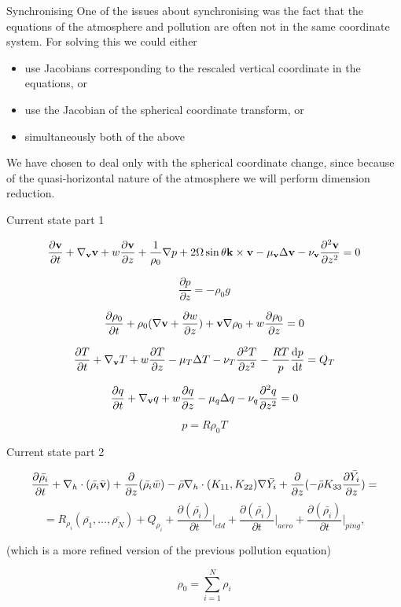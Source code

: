 \documentclass{beamer}
\begin{document}
\begin{frame}{Synchronising}
One of the issues about synchronising was the fact that the equations of the atmosphere and pollution are often not in the same coordinate system.
For solving this we could either
\begin{itemize}
\item use Jacobians corresponding to the rescaled vertical coordinate in the equations, or
\item use the Jacobian of the spherical coordinate transform, or
\item simultaneously both of the above
\end{itemize}
We have chosen to deal only with the spherical coordinate change, since because of the quasi-horizontal nature of the atmosphere we will perform dimension reduction. 
\end{frame}

\begin{frame}{Current state part 1}

\[ \frac{\partial \bold{v} }{\partial t} + \nabla_{\bold{v}}\bold{v} + w  \frac{\partial \bold{v} }{\partial z} + \frac{1}{\rho_0}\nabla p + 2 \Omega \sin \theta \bold{k} \times \bold{v}  -\mu_{\bold{v}}\Delta \bold{v}  -\nu_{\bold{v}} \frac{\partial ^ 2 \bold{v} }{\partial z^2} = 0  \]

\[ \frac{\partial p }{\partial z} = - \rho_0 g \]

\[ \frac{\partial \rho_0}{\partial t} + \rho_0 (\nabla \bold{v} + \frac{\partial w }{\partial z}) + \bold{v} \nabla \rho_0 + w \frac{\partial \rho_0}{\partial z} = 0 \]

\[ \frac{\partial T }{\partial t} + \nabla_{\bold{v}} T  + w  \frac{\partial T }{\partial z} - \mu_T \Delta T  -\nu_T \frac{\partial^2 T }{\partial z^2} -\frac{RT}{p} \frac{\mathrm{d}p}{\mathrm{d}t} = Q_T \]

\[ \frac{\partial q }{\partial t} + \nabla_{\bold{v}}q + w \frac{\partial q}{\partial z} - \mu_q \Delta q  - \nu_q \frac{\partial ^2 q }{\partial z^2} = 0 \]

\[ p = R \rho_0 T \]

\end{frame}

\begin{frame}{Current state part 2}

 \[ \frac{\partial \bar{\rho_i}}{\partial t}  + \nabla_{h} \cdot (\bar{\rho_i} \bar{\bold{v}}) + \frac{\partial}{\partial z} (\bar{\rho_i} \bar{w})  -\bar{\rho} \nabla_{h} \cdot (K_{11}, K_{22}) \nabla \bar{Y_i} + \frac{\partial}{\partial z} (-\bar{\rho} K_{33} \frac{\partial \bar{Y_i}}{\partial z}) = \]
 \[ = R_{\rho_i} (\bar{\rho_1}, \dots , \bar{\rho_N}) + Q_{\rho_i} + \frac{\partial (\bar{\rho_i})}{\partial t} \rvert_{cld} + \frac{\partial (\bar{\rho_i})}{\partial t} \rvert_{aero} + \frac{\partial (\bar{\rho_i})}{\partial t} \rvert_{ping},\]
 
 (which is a more refined version of the previous pollution equation)

\[ \rho_0 = \sum_{i =1}^{N} \rho_i \]

\end{frame}
\end{document}
